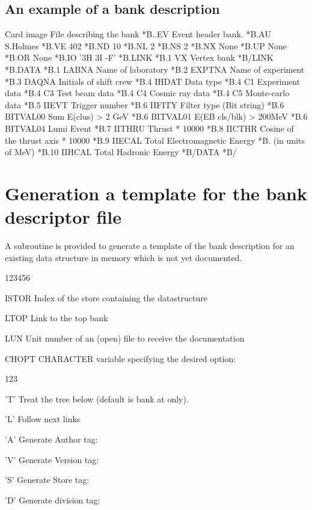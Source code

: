 \subsection{An example of a bank description}
 
\begin{XMPt}{Card image File describing the bank }
*B..EV  Event header bank.
*B.AU    S.Holmes
*B.VE    402
*B.ND    10
*B.NL    2
*B.NS    2
*B.NX    None
*B.UP    None
*B.OR    None
*B.IO    '3H 3I -F'
*B.LINK
*B.1   VX       Vertex bank
*B/LINK
*B.DATA
*B.1   LABNA     Name of laboratory
*B.2   EXPTNA    Name of experiment
*B.3   DAQNA     Initials of shift crew 
*B.4   IHDAT     Data type
*B.4   C1        Experiment data
*B.4   C3        Test beam data
*B.4   C4        Cosmic ray data
*B.4   C5        Monte-carlo data
*B.5   IIEVT     Trigger number
*B.6   IIFITY    Filter type (Bit string)
*B.6   BITVAL00  Sum E(clus) > 2 GeV
*B.6   BITVAL01  E(EB cls/blk) > 200MeV
*B.6   BITVAL04  Lumi Event
*B.7   IITHRU    Thrust * 10000
*B.8   IICTHR    Cosine of the thrust axis * 10000
*B.9   IIECAL    Total Electromagnetic Energy
*B.              (in units of MeV)
*B.10  IIHCAL    Total Hadronic Energy
*B/DATA
*B/
\end{XMPt}
 
\section{Generation a template for the bank descriptor file}
\label{sec:dzdocdzdtmp}  
 
A subroutine is provided to generate a template of the bank
description for an existing
data structure in memory which is not yet documented.
 
 
\Idesc
\begin{DLtt}{123456}
\item[ISTOR] Index of the store containing the datastructure
\item[LTOP]  Link to the top bank
\item[LUN]   Unit number of an (open) file to receive the documentation
\item[CHOPT] CHARACTER variable specifying the desired option:
\begin{DLtt}{123}
\item['T'] Treat the tree below  
           (default is bank at  only).
\item['L'] Follow next links
\item['A'] Generate Author tag: 
\item['V'] Generate Version tag: 
\item['S'] Generate Store tag:   
\item['D'] Generate division tag: 
\end{DLtt} 
\end{DLtt} 
 
